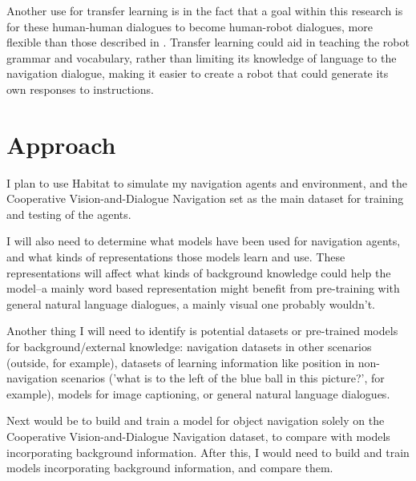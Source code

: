 \documentclass{article}
\begin{document}
Another use for transfer learning is in the fact that a goal within this research is for these human-human dialogues to become human-robot dialogues, more flexible than those described in \cite{thomason2019grounded}. Transfer learning could aid in teaching the robot grammar and vocabulary, rather than limiting its knowledge of language to the navigation dialogue, making it easier to create a robot that could generate its own responses to instructions. 

\section{Approach}
I plan to use Habitat to simulate my navigation agents and environment, and the Cooperative Vision-and-Dialogue Navigation set as the main dataset for training and testing of the agents. 

I will also need to determine what models have been used for navigation agents, and what kinds of representations those models learn and use. These representations will affect what kinds of background knowledge could help the model--a mainly word based representation might benefit from pre-training with general natural language dialogues, a mainly visual one probably wouldn't.

Another thing I will need to identify is potential datasets or pre-trained models for background/external knowledge: navigation datasets in other scenarios (outside, for example), datasets of learning information like position in non-navigation scenarios ('what is to the left of the blue ball in this picture?', for example), models for image captioning, or general natural language dialogues.

Next would be to build and train a model for object navigation solely on the Cooperative Vision-and-Dialogue Navigation dataset, to compare with models incorporating background information. After this, I would need to build and train models incorporating background information, and compare them. 



\end{document}
